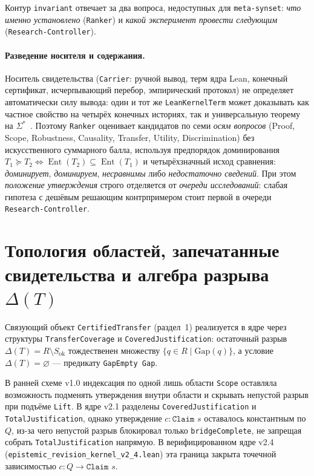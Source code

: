 \documentclass[11pt,a4paper]{article}
\theoremstyle{preprintthm}
\theoremstyle{preprintdef}
\newcommand{\Ent}{\operatorname{Ent}}
\begin{document}
Контур \texttt{invariant} отвечает за два вопроса, недоступных для \texttt{meta-synset}: \emph{что именно установлено} (\texttt{Ranker}) и \emph{какой эксперимент провести следующим} (\texttt{Research-Controller}).

\paragraph{Разведение носителя и содержания.}
Носитель свидетельства (\texttt{Carrier}: ручной вывод, терм ядра Lean, конечный сертификат, исчерпывающий перебор, эмпирический протокол) не определяет автоматически силу вывода: один и тот же \texttt{LeanKernelTerm} может доказывать как частное свойство на четырёх конечных историях, так и универсальную теорему на $\Sigma^*$~\cite{strand2026ms2}. Поэтому \texttt{Ranker} оценивает кандидатов по семи \emph{осям вопросов} (Proof, Scope, Robustness, Causality, Transfer, Utility, Discrimination) без искусственного суммарного балла, используя предпорядок доминирования $T_1 \succeq T_2 \iff \Ent(T_2)\subseteq\Ent(T_1)$ и четырёхзначный исход сравнения: \emph{доминирует}, \emph{доминируем}, \emph{несравнимы} либо \emph{недостаточно сведений}. При этом \emph{положение утверждения} строго отделяется от \emph{очереди исследований}: слабая гипотеза с дешёвым решающим контрпримером стоит первой в очереди \texttt{Research-Controller}.

\section{Топология областей, запечатанные свидетельства и алгебра разрыва \texorpdfstring{$\Delta(T)$}{Delta(T)}}
\label{sec:topology}

Связующий объект \texttt{CertifiedTransfer} (раздел~1) реализуется в ядре через структуры \texttt{TransferCoverage} и \texttt{CoveredJustification}: остаточный разрыв $\Delta(T)=R\setminus S_{\mathrm{ok}}$ тождественен множеству $\{q\in R\mid \mathrm{Gap}(q)\}$, а условие $\Delta(T)=\varnothing$ --- предикату \texttt{GapEmpty Gap}.

В ранней схеме v1.0 индексация по одной лишь области \texttt{Scope} оставляла возможность подменять утверждения внутри области и скрывать непустой разрыв при подъёме \texttt{Lift}. В ядре v2.1 разделены \texttt{CoveredJustification} и \texttt{TotalJustification}, однако утверждение $c:\texttt{Claim } s$ оставалось константным по $Q$, из-за чего непустой разрыв блокировал только \texttt{bridgeComplete}, не запрещая собрать \texttt{TotalJustification} напрямую. В верифицированном ядре v2.4 (\texttt{epistemic\_\allowbreak revision\_\allowbreak kernel\_\allowbreak v2\_\allowbreak 4.lean}) эта граница закрыта точечной зависимостью $c : Q \to \texttt{Claim } s$.
\end{document}

